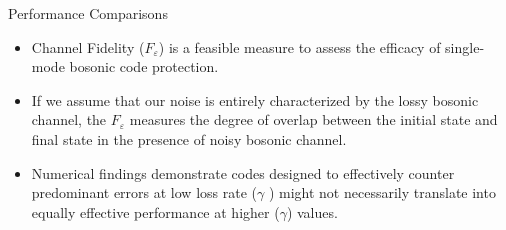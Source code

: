 \documentclass[8pt,final,hyperref={pdfpagelabels=false}]{beamer}
\theoremstyle{plain}
\newcommand\0{\mathbf{0}}
\begin{document}
\begin{frame}
\begin{columns}[t]
\begin{column}{.23\textwidth}
\begin{block}{Performance Comparisons}
      \begin{itemize}
          \item Channel Fidelity ($F_\varepsilon$) is a feasible measure to assess the efficacy of single-mode bosonic code protection.
          \item If we assume that our noise is entirely characterized by the lossy bosonic channel, the $F_\varepsilon$ measures the degree of overlap between the initial state and final state in the presence of noisy bosonic channel.
          \item  Numerical findings demonstrate codes designed to effectively counter predominant errors at low loss rate ($\gamma$ ) might not necessarily translate into equally effective performance at higher ($\gamma$) values.  \begin{figure}
            

\end{figure}
\end{itemize}
\end{block}
\end{column}
\end{columns}
\end{frame}
\end{document}
